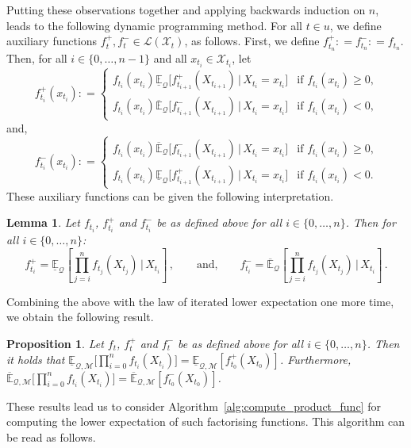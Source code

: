 \documentclass[3p]{elsarticle}
\newtheorem{proposition}[theorem]{Proposition}
\newtheorem{lemma}[theorem]{Lemma}
\newcommand{\states}{\mathcal{X}}
\newcommand{\lexp}{\underline{\mathbb{E}}_{\rateset,\mathcal{M}}}
\newcommand{\uexp}{\overline{\mathbb{E}}_{\rateset,\mathcal{M}}}
\newcommand{\gambles}{\mathcal{L}}
\newcommand{\rateset}{\mathcal{Q}}
\newcommand{\coloneqq}{:\!=}
\begin{document}
Putting these observations together and applying backwards induction on $n$, leads to the following dynamic programming method. For all $t\in u$, we define auxiliary functions $f_t^+,f_t^-\in\gambles(\states_t)$, as follows. First, we define $f_{t_n}^+\coloneqq f_{t_n}^-\coloneqq f_{t_n}$. Then, for all $i\in\{0,\ldots,n-1\}$ and all $x_{t_i}\in\states_{t_i}$, let
\begin{equation*}
f_{t_i}^+(x_{t_i}) \coloneqq \left\{\begin{array}{ll}
f_{t_i}(x_{t_i})\underline{\mathbb{E}}_\rateset\bigl[f_{t_{i+1}}^+(X_{t_{i+1}})\,\vert\,X_{t_i}=x_{t_i}\bigr] & \text{if $f_{t_i}(x_{t_i})\geq 0$,} \\
f_{t_i}(x_{t_i})\overline{\mathbb{E}}_\rateset\bigl[f_{t_{i+1}}^-(X_{t_{i+1}})\,\vert\,X_{t_i}=x_{t_i}\bigr] & \text{if $f_{t_i}(x_{t_i})< 0$,}
\end{array}\right.
\end{equation*}
and,
\begin{equation*}
f_{t_i}^-(x_{t_i}) \coloneqq \left\{\begin{array}{ll}
f_{t_i}(x_{t_i})\overline{\mathbb{E}}_\rateset\bigl[f_{t_{i+1}}^-(X_{t_{i+1}})\,\vert\,X_{t_i}=x_{t_i}\bigr] & \text{if $f_{t_i}(x_{t_i})\geq 0$,} \\
f_{t_i}(x_{t_i})\underline{\mathbb{E}}_\rateset\bigl[f_{t_{i+1}}^+(X_{t_{i+1}})\,\vert\,X_{t_i}=x_{t_i}\bigr] & \text{if $f_{t_i}(x_{t_i})< 0$.}
\end{array}\right.
\end{equation*}
These auxiliary functions can be given the following interpretation.
\begin{lemma}\label{lemma:product_func_induction}
Let $f_{t_i}$, $f_{t_i}^+$ and $f_{t_i}^-$ be as defined above for all $i\in\{0,\ldots,n\}$. Then for all $i\in\{0,\dots,n\}$:
\begin{equation*}
f_{t_i}^+ = \underline{\mathbb{E}}_{\rateset}\left[\prod_{j=i}^{n}f_{t_j}(X_{t_j})\,\Bigg\vert\,X_{t_i}\right]\,, \quad\quad\text{and,} \quad\quad f_{t_i}^- = \overline{\mathbb{E}}_{\rateset}\left[\prod_{j=i}^{n}f_{t_j}(X_{t_j})\,\Bigg\vert\,X_{t_i}\right]\,.
\end{equation*}
\end{lemma}
Combining the above with the law of iterated lower expectation one more time, we obtain the following result.
\begin{proposition}\label{prop:computing_product_funcs}
Let $f_{t}$, $f_{t}^+$ and $f_{t}^-$ be as defined above for all $i\in\{0,\ldots,n\}$. Then it holds that
$\lexp\bigl[\prod_{i=0}^nf_{t_i}(X_{t_i})\bigr] = \lexp\left[f_{t_0}^+(X_{t_0})\right]$. Furthermore,
$\uexp\bigl[\prod_{i=0}^nf_{t_i}(X_{t_i})\bigr]=\uexp\left[f_{t_0}^-(X_{t_0})\right]$.
\end{proposition}
These results lead us to consider Algorithm~\ref{alg:compute_product_func} for computing the lower expectation of such factorising functions. This algorithm can be read as follows.
\end{document}
